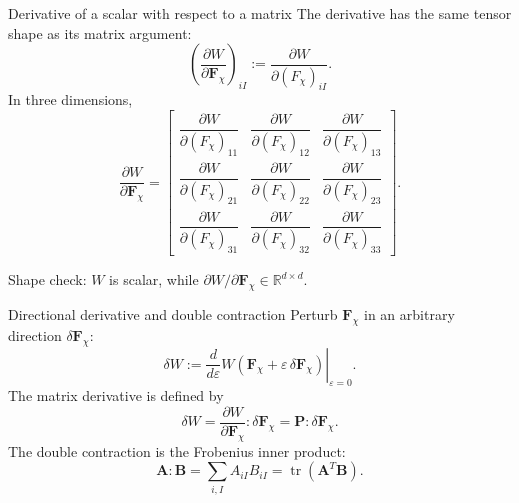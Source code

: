 \documentclass[aspectratio=169,11pt]{beamer}
\newcommand{\R}{\mathbb{R}}
\newcommand{\Fdef}{\bm{F}_{\chi}}
\newcommand{\Pten}{\bm{P}}
\begin{document}
\begin{frame}{Derivative of a scalar with respect to a matrix}
The derivative has the same tensor shape as its matrix argument:
\[
  \left(
  \frac{\partial W}{\partial\Fdef}
  \right)_{iI}
  :=
  \frac{\partial W}{\partial(F_\chi)_{iI}}.
\]
In three dimensions,
\[
  \frac{\partial W}{\partial\Fdef}
  =
  \begin{bmatrix}
  \dfrac{\partial W}{\partial(F_\chi)_{11}}&
  \dfrac{\partial W}{\partial(F_\chi)_{12}}&
  \dfrac{\partial W}{\partial(F_\chi)_{13}}\\[12pt]
  \dfrac{\partial W}{\partial(F_\chi)_{21}}&
  \dfrac{\partial W}{\partial(F_\chi)_{22}}&
  \dfrac{\partial W}{\partial(F_\chi)_{23}}\\[12pt]
  \dfrac{\partial W}{\partial(F_\chi)_{31}}&
  \dfrac{\partial W}{\partial(F_\chi)_{32}}&
  \dfrac{\partial W}{\partial(F_\chi)_{33}}
  \end{bmatrix}.
\]
\begin{punchbox}
\small
Shape check: \(W\) is scalar, while
\(\partial W/\partial\Fdef\in\R^{d\times d}\).
\end{punchbox}
\end{frame}

\begin{frame}{Directional derivative and double contraction}
Perturb \(\Fdef\) in an arbitrary direction \(\delta\Fdef\):
\[
  \delta W
  :=
  \left.
  \frac{d}{d\varepsilon}
  W(\Fdef+\varepsilon\,\delta\Fdef)
  \right|_{\varepsilon=0}.
\]
The matrix derivative is defined by
\[
  \boxed{
  \delta W
  =
  \frac{\partial W}{\partial\Fdef}:\delta\Fdef
  =
  \Pten:\delta\Fdef
  }.
\]
The double contraction is the Frobenius inner product:
\[
  \bm{A}:\bm{B}
  =
  \sum_{i,I}A_{iI}B_{iI}
  =
  \operatorname{tr}(\bm{A}^T\bm{B}).
\]
\end{frame}
\end{document}
